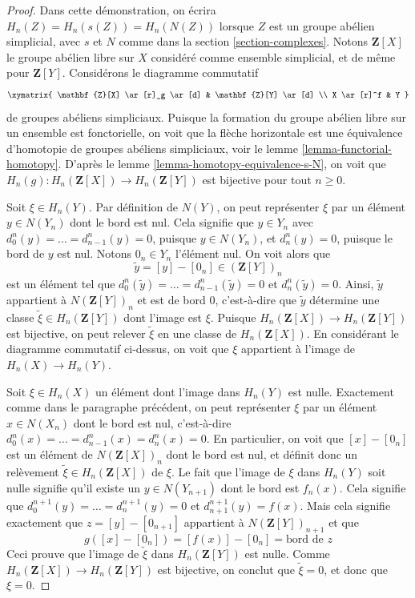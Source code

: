 \begin{proof}
Dans cette démonstration, on écrira $H_n(Z) = H_n(s(Z)) = H_n(N(Z))$
lorsque $Z$ est un groupe abélien simplicial, avec $s$ et $N$ comme dans la
section \ref{section-complexes}.
Notons $\mathbf{Z}[X]$ le groupe abélien libre sur $X$ considéré comme
ensemble simplicial, et de même pour $\mathbf{Z}[Y]$. Considérons le
diagramme commutatif
$$
\xymatrix{
\mathbf{Z}[X] \ar[r]_g \ar[d] &
\mathbf{Z}[Y] \ar[d] \\
X \ar[r]^f & Y
}
$$
de groupes abéliens simpliciaux. Puisque la formation du groupe abélien
libre sur un ensemble est fonctorielle, on voit que la flèche horizontale
est une équivalence d'homotopie de groupes abéliens simpliciaux, voir le
lemme \ref{lemma-functorial-homotopy}. D'après le lemme
\ref{lemma-homotopy-equivalence-s-N}, on voit que
$H_n(g) : H_n(\mathbf{Z}[X]) \to H_n(\mathbf{Z}[Y])$ est bijective pour tout
$n \geq 0$.

\medskip\noindent
Soit $\xi \in H_n(Y)$. Par définition de $N(Y)$, on peut représenter
$\xi$ par un élément $y \in N(Y_n)$ dont le bord est nul.
Cela signifie que $y \in Y_n$ avec
$d^n_0(y) = \ldots = d^n_{n - 1}(y) = 0$, puisque $y \in N(Y_n)$, et
$d^n_n(y) = 0$, puisque le bord de $y$ est nul. Notons $0_n \in Y_n$
l'élément nul. On voit alors que
$$
\tilde y = [y] - [0_n] \in (\mathbf{Z}[Y])_n
$$
est un élément tel que
$d^n_0(\tilde y) = \ldots = d^n_{n - 1}(\tilde y) = 0$
et $d^n_n(\tilde y) = 0$. Ainsi, $\tilde y$ appartient à
$N(\mathbf{Z}[Y])_n$ et est de bord $0$, c'est-à-dire que $\tilde y$
détermine une classe $\tilde \xi \in H_n(\mathbf{Z}[Y])$ dont l'image est
$\xi$. Puisque $H_n(\mathbf{Z}[X]) \to H_n(\mathbf{Z}[Y])$ est bijective,
on peut relever $\tilde \xi$ en une classe de $H_n(\mathbf{Z}[X])$.
En considérant le diagramme commutatif ci-dessus, on voit que $\xi$
appartient à l'image de $H_n(X) \to H_n(Y)$.

\medskip\noindent
Soit $\xi \in H_n(X)$ un élément dont l'image dans $H_n(Y)$ est nulle.
Exactement comme dans le paragraphe précédent, on peut représenter
$\xi$ par un élément $x \in N(X_n)$ dont le bord est nul, c'est-à-dire
$d^n_0(x) = \ldots = d^n_{n - 1}(x) = d^n_n(x) = 0$.
En particulier, on voit que $[x] - [0_n]$ est un élément de
$N(\mathbf{Z}[X])_n$ dont le bord est nul, et définit donc un relèvement
$\tilde \xi \in H_n(\mathbf{Z}[X])$ de $\xi$.
Le fait que l'image de $\xi$ dans $H_n(Y)$ soit nulle signifie qu'il existe
un $y \in N(Y_{n + 1})$ dont le bord est $f_n(x)$.
Cela signifie que $d^{n + 1}_0(y) = \ldots = d^{n + 1}_n(y) = 0$ et
$d^{n + 1}_{n + 1}(y) = f(x)$.
Mais cela signifie exactement que
$z = [y] - [0_{n + 1}]$ appartient à $N(\mathbf{Z}[Y])_{n + 1}$ et que
$$
g([x] - [0_n]) = [f(x)] - [0_n] = \text{bord de }z
$$
Ceci prouve que l'image de $\tilde \xi$ dans $H_n(\mathbf{Z}[Y])$ est nulle.
Comme $H_n(\mathbf{Z}[X]) \to H_n(\mathbf{Z}[Y])$ est bijective,
on conclut que $\tilde \xi = 0$, et donc que $\xi = 0$.
\end{proof}






